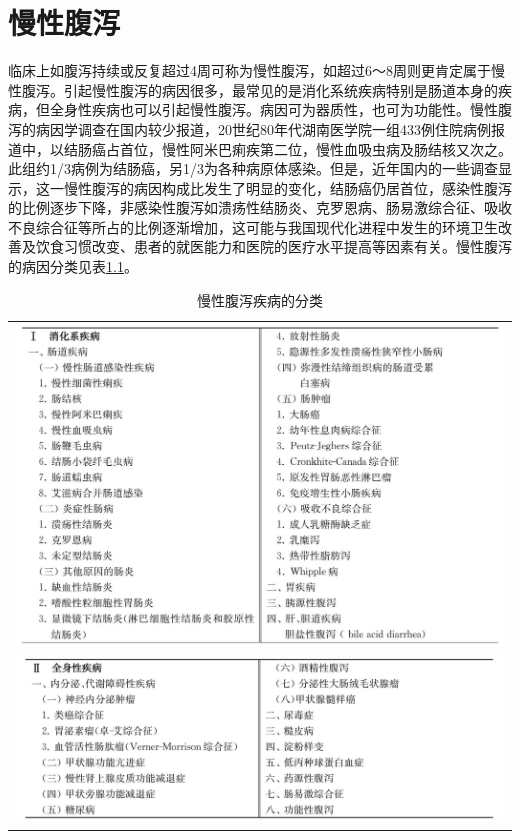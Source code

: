 \chapter{慢性腹泻}

临床上如腹泻持续或反复超过4周可称为慢性腹泻，如超过6～8周则更肯定属于慢性腹泻。引起慢性腹泻的病因很多，最常见的是消化系统疾病特别是肠道本身的疾病，但全身性疾病也可以引起慢性腹泻。病因可为器质性，也可为功能性。慢性腹泻的病因学调查在国内较少报道，20世纪80年代湖南医学院一组433例住院病例报道中，以结肠癌占首位，慢性阿米巴痢疾第二位，慢性血吸虫病及肠结核又次之。此组约1/3病例为结肠癌，另1/3为各种病原体感染。但是，近年国内的一些调查显示，这一慢性腹泻的病因构成比发生了明显的变化，结肠癌仍居首位，感染性腹泻的比例逐步下降，非感染性腹泻如溃疡性结肠炎、克罗恩病、肠易激综合征、吸收不良综合征等所占的比例逐渐增加，这可能与我国现代化进程中发生的环境卫生改善及饮食习惯改变、患者的就医能力和医院的医疗水平提高等因素有关。慢性腹泻的病因分类见表\ref{tab24-1}。

\begin{longtable}{c}
 \caption{慢性腹泻疾病的分类}
 \label{tab24-1}
 \endfirsthead
 \caption[]{慢性腹泻疾病的分类}
 \endhead
 \includegraphics[width=\textwidth,height=\textheight,keepaspectratio]{./images/Image00133.jpg}\\
 \includegraphics[width=\textwidth,height=\textheight,keepaspectratio]{./images/Image00134.jpg}
 \end{longtable}

